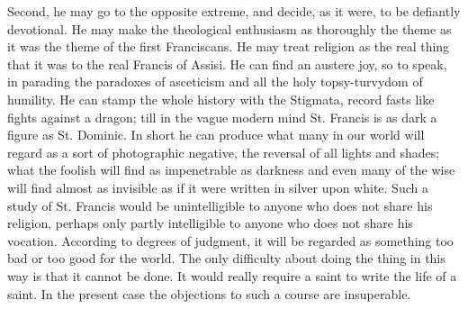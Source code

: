 \documentclass{book}
\begin{document}
Second, he may go to the opposite extreme, and decide, as it were, to be defiantly devotional. He may make the theological enthusiasm as thoroughly the theme as it was the theme of the first Franciscans. He may treat religion as the real thing that it was to the real Francis of Assisi. He can find an austere joy, so to speak, in parading the paradoxes of asceticism and all the holy topsy-turvydom of humility. He can stamp the whole history with the Stigmata, record fasts like fights against a dragon; till in the vague modern mind St. Francis is as dark a figure as St. Dominic. In short he can produce what many in our world will regard as a sort of photographic negative, the reversal of all lights and shades; what the foolish will find as impenetrable as darkness and even many of the wise will find almost as invisible as if it were written in silver upon white. Such a study of St. Francis would be unintelligible to anyone who does not share his religion, perhaps only partly intelligible to anyone who does not share his vocation. According to degrees of judgment, it will be regarded as something too bad or too good for the world. The only difficulty about doing the thing in this way is that it cannot be done. It would really require a saint to write the life of a saint. In the present case the objections to such a course are insuperable.
\end{document}
